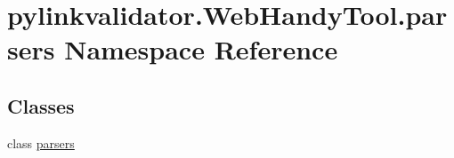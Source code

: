 \hypertarget{namespacepylinkvalidator_1_1_web_handy_tool_1_1parsers}{}\section{pylinkvalidator.\+Web\+Handy\+Tool.\+parsers Namespace Reference}
\label{namespacepylinkvalidator_1_1_web_handy_tool_1_1parsers}
\subsection*{Classes}
\begin{DoxyCompactItemize}
\item 
class \hyperlink{classpylinkvalidator_1_1_web_handy_tool_1_1parsers_1_1parsers}{parsers}
\end{DoxyCompactItemize}
